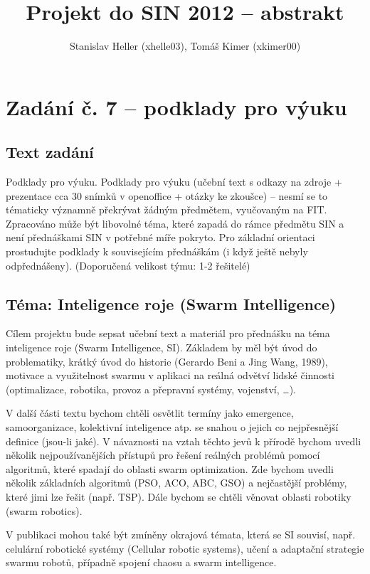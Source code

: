 \documentclass[a4paper,12pt]{article}
\title{Projekt do SIN 2012 -- abstrakt}
\author{Stanislav Heller (xhelle03), Tomáš Kimer (xkimer00)}
\begin{document}
\maketitle

\section*{Zadání č. 7 -- podklady pro výuku}
\vspace{5mm}
\subsection*{Text zadání}
Podklady pro výuku. Podklady pro výuku (učební text s odkazy na zdroje
+ prezentace cca 30 snímků v openoffice + otázky ke zkoušce) -- nesmí se
to tématicky významně překrývat žádným předmětem, vyučovaným na FIT.
Zpracováno může být libovolné téma, které zapadá do rámce předmětu SIN
a není přednáškami SIN v potřebné míře pokryto. Pro základní orientaci
prostudujte podklady k souvisejícím přednáškám (i když ještě nebyly
odpřednášeny). (Doporučená velikost týmu: 1-2 řešitelé)

\subsection*{Téma: Inteligence roje (Swarm Intelligence)}
Cílem projektu bude sepsat učební text a materiál pro přednášku na téma
inteligence roje (Swarm Intelligence, SI). Základem by měl být úvod do problematiky,
krátký úvod do historie (Gerardo Beni a Jing Wang, 1989), motivace a využitelnost
swarmu v aplikaci na reálná odvětví lidské činnosti (optimalizace, robotika,
provoz a přepravní systémy, vojenství, \dots).

V další části textu bychom chtěli osvětlit termíny jako emergence, samoorganizace,
kolektivní inteligence atp. se snahou o jejich co nejpřesnější definice (jsou-li jaké).
V návaznosti na vztah těchto jevů k přírodě bychom uvedli několik nejpoužívanějších
přístupů pro řešení reálných problémů pomocí algoritmů, které spadají do oblasti
swarm optimization. Zde bychom uvedli několik základních algoritmů (PSO, ACO, ABC, GSO)
a nejčastější problémy, které jimi lze řešit (např. TSP). Dále bychom se chtěli
věnovat oblasti robotiky (swarm robotics).

V publikaci mohou také být zmíněny okrajová témata, která se SI souvisí, např.
celulární robotické systémy (Cellular robotic systems), učení a adaptační strategie
swarmu robotů, případně spojení chaosu a swarm intelligence.
\end{document}
